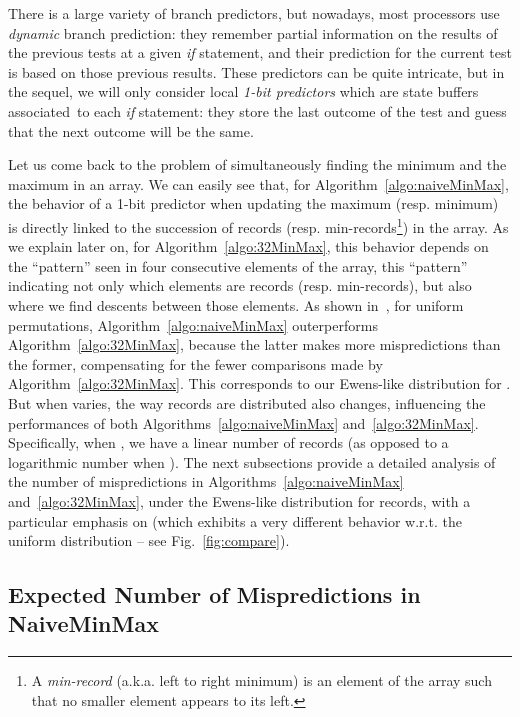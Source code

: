 \documentclass[proceedings]{aofa}
\begin{document}
There is a large variety of branch predictors, but nowadays, most processors use {\em dynamic} branch prediction: 
they remember partial information on the results of the previous tests at a given \emph{if} statement, 
and their prediction for the current test is based on those previous results.
These predictors can be quite intricate, but in the sequel, we will only consider local {\em 1-bit predictors} which are state buffers associated~to each \emph{if} statement: they store the last outcome of the test and guess that the next outcome will be the same. 

Let us come back to the problem of simultaneously finding the minimum and the maximum in an array. 
We can easily see that, for Algorithm~\ref{algo:naiveMinMax}, the behavior of a 1-bit predictor when updating the maximum (resp. minimum) 
is directly linked to the succession of records (resp. min-records\footnote{
A \emph{min-record} (a.k.a. left to right minimum) is an element of the array such that no smaller element appears to its left.}) 
in the array. 
As we explain later on, for Algorithm~\ref{algo:32MinMax}, this behavior depends on the ``pattern'' seen 
in four consecutive elements of the array, this ``pattern'' indicating not only which elements are records (resp. min-records), 
but also where we find descents between those elements. 
As shown in~\cite{AuNiPi16}, for uniform permutations, Algorithm~\ref{algo:naiveMinMax} outerperforms Algorithm~\ref{algo:32MinMax}, 
because the latter makes more mispredictions than the former, compensating for the fewer comparisons made by Algorithm~\ref{algo:32MinMax}. 
This corresponds to our Ewens-like distribution for . 
But when  varies, the way records are distributed also changes, influencing the performances of both Algorithms~\ref{algo:naiveMinMax} and~\ref{algo:32MinMax}. 
Specifically, when , we have a linear number of records (as opposed to a logarithmic number when ). 
The next subsections provide a detailed analysis of the number of mispredictions in Algorithms~\ref{algo:naiveMinMax} and~\ref{algo:32MinMax}, 
under the Ewens-like distribution for records, with a particular emphasis on 
(which exhibits a very different behavior w.r.t. the uniform distribution -- see Fig.~\ref{fig:compare}). 


\subsection{Expected Number of Mispredictions in NaiveMinMax}\label{sec:naive}
\end{document}
